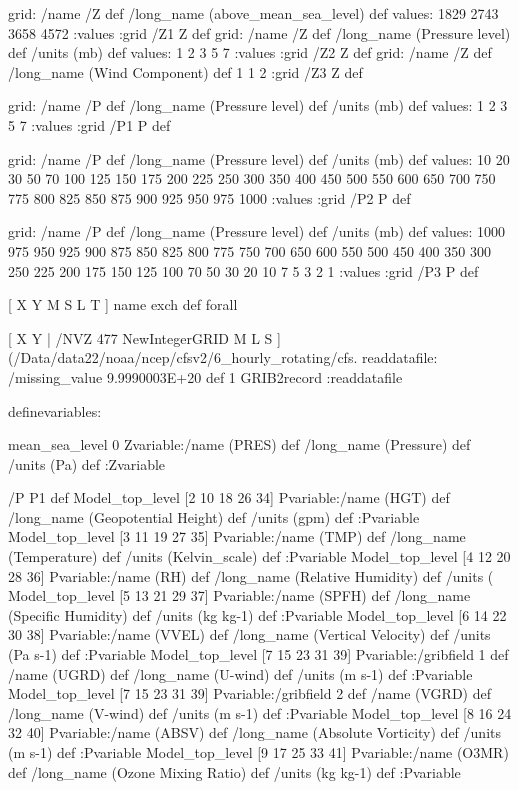 \begin{ingrid}

grid:
/name /Z def
/long_name (above_mean_sea_level) def
values:
1829 2743 3658 4572 
:values
:grid
/Z1 Z def
grid:
/name /Z def
/long_name (Pressure level) def
/units (mb) def
values:
1 2 3 5 7 :values
:grid
/Z2 Z def
grid:
/name /Z def
/long_name (Wind Component) def
1 1 2
:grid
/Z3 Z def

grid:
/name /P def
/long_name (Pressure level) def
/units (mb) def
values:
1 2 3 5 7 :values
:grid
/P1 P def

grid:
/name /P def
/long_name (Pressure level) def
/units (mb) def
values:
10 20 30 50 70 100 125 150 175 200 225 250 300 350 400 450 500 550 600 650 700 750 775 800 825 850 875 900 925 950 975 1000 :values
:grid
/P2 P def

grid:
/name /P def
/long_name (Pressure level) def
/units (mb) def
values:
1000 975 950 925 900 875 850 825 800 775 750 700 650 600 550 500 450 400 350 300 250 225 200 175 150 125 100 70 50 30 20 10 7 5 3 2 1 :values
:grid
/P3 P def

[ X Y M S L T ] { name exch def } forall

\end{ingrid}
\begin{ingrid}

[ X Y | /NVZ 477 NewIntegerGRID M L S ] 
(/Data/data22/noaa/ncep/cfsv2/6_hourly_rotating/cfs.%
readdatafile: 
/missing_value 9.9990003E+20 def
1 GRIB2record
:readdatafile

\end{ingrid}
\begin{ingrid}

definevariables:
 
mean_sea_level 0  Zvariable:/name (PRES) def /long_name (Pressure) def /units (Pa) def :Zvariable

/P P1 def
Model_top_level [2 10 18 26 34] Pvariable:/name (HGT) def /long_name (Geopotential Height) def /units (gpm) def :Pvariable
Model_top_level [3 11 19 27 35] Pvariable:/name (TMP) def /long_name (Temperature) def /units (Kelvin_scale) def :Pvariable
Model_top_level [4 12 20 28 36] Pvariable:/name (RH) def /long_name (Relative Humidity) def /units (%
Model_top_level [5 13 21 29 37] Pvariable:/name (SPFH) def /long_name (Specific Humidity) def /units (kg kg-1) def :Pvariable
Model_top_level [6 14 22 30 38] Pvariable:/name (VVEL) def /long_name (Vertical Velocity) def /units (Pa s-1) def :Pvariable
Model_top_level [7 15 23 31 39] Pvariable:/gribfield 1 def /name (UGRD) def /long_name (U-wind) def /units (m s-1) def :Pvariable
Model_top_level [7  15 23 31 39] Pvariable:/gribfield 2 def /name (VGRD) def /long_name (V-wind) def /units (m s-1) def :Pvariable
Model_top_level [8 16 24 32 40] Pvariable:/name (ABSV) def /long_name (Absolute Vorticity) def /units (m s-1) def :Pvariable
Model_top_level [9 17 25 33 41] Pvariable:/name (O3MR) def /long_name (Ozone Mixing Ratio) def /units (kg kg-1) def :Pvariable

\end{ingrid}
